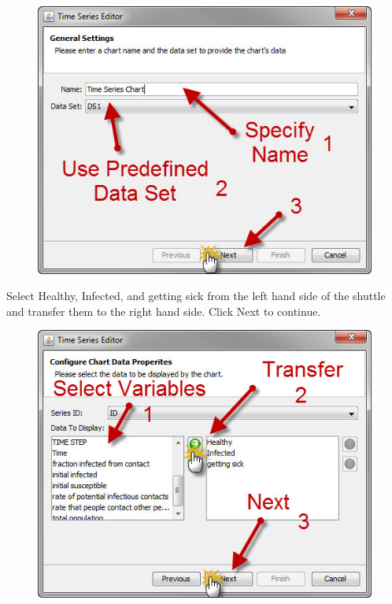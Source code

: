 \documentclass[11pt]{amsart}
\begin{document}
\begin{figure}[ht]
\begin{center}
\vspace{.2in}
\centerline {
\includegraphics[totalheight=0.3\textheight]{images/037.jpg}
}
\caption{}
\label{fig:037}
\end{center}
\end{figure}


Select Healthy, Infected, and getting sick from the left hand side of the shuttle and transfer them to the right hand side. Click Next to continue.


\begin{figure}[ht]
\begin{center}
\vspace{.2in}
\centerline {
\includegraphics[totalheight=0.3\textheight]{images/038.jpg}
}
\caption{}
\label{fig:038}
\end{center}
\end{figure}
\end{document}
